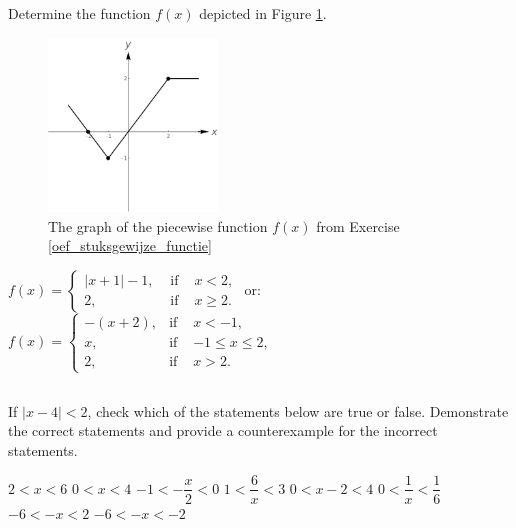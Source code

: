 \begin{Exercise}[difficulty = 1, label = oef_stuksgewijze_functie] Determine the function $f(x)$ depicted in Figure \ref{fig_functions_44_NL}.
\begin{figure}[H]
\begin{center}
	\includegraphics[width=0.4\textwidth]{fig_functions_44}
	\caption{The graph of the piecewise function $f(x)$ from Exercise \ref{oef_stuksgewijze_functie}}
	\label{fig_functions_44_NL}
\end{center}
\end{figure} 
\end{Exercise}

\begin{Answer}\phantom{}
    $f(x)= \left\{\begin{array}{rcl} |x+1| - 1, & \mbox{ if } & x < 2, \\ 2,  & \mbox{ if }&  x \geq 2. \end{array}\right.$ \qquad or: \quad $f(x)=\left\{ \begin{array}{rcl}
	 -(x+2), & \text{if } &  x<-1, \\
	 x, & \text{if} & -1 \leq x \leq 2, \\
	 2, & \text{if }& x>2.
	 \end{array}
	 \right. $
\end{Answer}


\subsection*{}

\ifcalculus
	\begin{Exercise}[difficulty = 2] If $|x-4|<2$, check which of the statements below are true or false. Demonstrate the correct statements and provide a counterexample for the incorrect statements. 
	\begin{multicols}{2}
			\Question $2 < x < 6$
			\Question $0 < x < 4$
			\Question $-1 < -\dfrac{x}{2} < 0$
			\Question $1 < \dfrac{6}{x} < 3$
			\Question $0 < x-2 < 4$
			\Question $0 < \dfrac{1}{x} < \dfrac{1}{6}$
			\Question $-6 < -x < 2$
			\Question $-6 < -x < -2$
			\EndCurrentQuestion
	\end{multicols}
	\end{Exercise}
	
